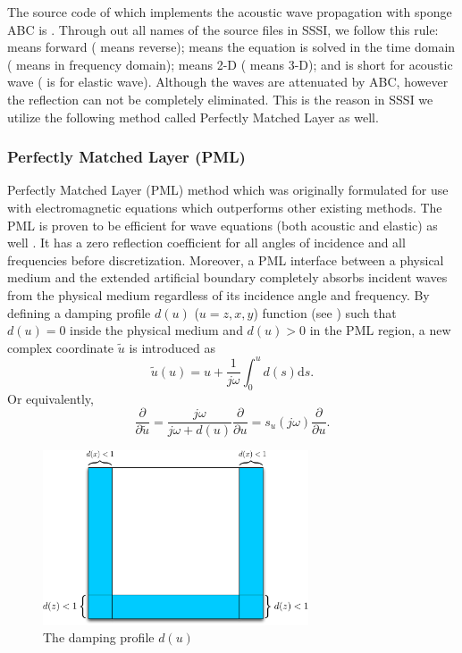 \documentclass[11pt]{article}
\theoremstyle{plain}
\theoremstyle{definition}
\theoremstyle{remark}
\numberwithin{equation}{section}
\begin{document}
The source code of which implements the acoustic wave propagation with sponge ABC 
is . Through out all names of the source files in SSSI,  we follow this rule:  means forward ( means reverse);  means the equation is solved in the time domain ( means in frequency domain);  means 2-D ( means 3-D); and  is short
 for acoustic wave ( is for elastic wave).  Although the waves are attenuated by ABC, however the reflection can not be completely eliminated. This is the reason in SSSI we utilize the following method called Perfectly Matched Layer as well. 



\subsubsection{Perfectly Matched Layer (PML)}
 Perfectly Matched Layer (PML) method which was originally formulated for use with electromagnetic equations which outperforms other existing methods. The PML is proven to be efficient for wave equations (both acoustic and elastic) as well \cite{KomMar2007}. It has a zero reflection coefficient for all angles of incidence and all frequencies before discretization. Moreover, a PML interface between a physical medium and the extended artificial boundary completely absorbs incident waves from the physical medium regardless of its incidence angle and frequency.
By defining a damping profile $d(u)$ ($u=z, x, y$) function (see ) such that $d(u) = 0$ inside the physical medium and $d(u) > 0$ in the PML region, a new complex coordinate $\tilde{u}$ is introduced as
  \begin{equation}\label{replace}
  \tilde{u}(u) = u + \frac{1}{j\omega}\int_0^u d(s)\mathrm{d}s.
  \end{equation}
Or equivalently,
  \begin{equation}
  \frac{\partial}{\partial \tilde{u}} = \frac{j\omega}{j\omega + d(u)}\frac{\partial}{\partial u} = s_u(j\omega)\frac{\partial}{\partial u}.
  \end{equation} 
  
\begin{figure}
\centering
\includegraphics[width=0.7\textwidth]{Fig/SpongeABC.pdf}
\caption{The damping profile $d(u)$}
\end{figure}
\end{document}
